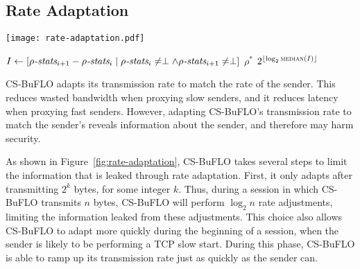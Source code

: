 \documentclass[10pt,journal]{IEEEtran}
\newcommand{\csb} {CS-BuFLO\xspace}
\begin{document}
\subsection{Rate Adaptation}
\label{ssec:rate-adaptation}



\begin{figure*}[t]
  \centering
  \texttt{[image: rate-adaptation.pdf]}
  \caption{Rate adaptation in \csb. $\rho^*$ is updated based on the packets
	  transmitted to the other end between $T_2$ and $T_{15}$. Time intervals
	  between two consecutive packets are stored in an array $Intervals[]$.
	  The two packets under consideration both contain some real payload
	  data and they belong to the same burst. i.e. $Intervals = [T_3-T_2,
	  T_5-T_3, T_9-T_8, T_{12}-T_{11}, T_{14}-T_{12}, T_{15}-T_{14}]$
	  and $\rho^*=2^{\lfloor\log_2 Median(Intervals[])\rfloor}$.}
  \label{fig:rate-adaptation}
\end{figure*}


\begin{algorithm}[t]
  \caption{Algorithm for estimating new value of $\rho^*$ based on past network performance.}
  \label{alg:rho-estimator}
  \begin{algorithmic}
    \State $I \gets \left[\rho\emph{-stats}_{i+1}-\rho\emph{-stats}_{i}\mid \rho\emph{-stats}_{i}\not=\perp\wedge \rho\emph{-stats}_{i+1}\not=\perp\right]$
      \State\Return $\rho^*$
    \Else
      \State\Return$2^{\lfloor\log_2\Call{median}{I}\rfloor}$
    \EndIf
    \EndFunction
  \end{algorithmic}
\end{algorithm}


\csb adapts its transmission rate to match the rate of the sender.
This reduces wasted bandwidth when proxying slow senders, and it
reduces latency when proxying fast senders.  However, adapting
\csb's transmission rate to match the sender's reveals information
about the sender, and therefore may harm security.

As shown in Figure~\ref{fig:rate-adaptation}, \csb takes several steps to limit
the information that is leaked through rate adaptation.  First, it only adapts
after transmitting $2^k$ bytes, for some integer $k$.  Thus, during a session
in which \csb transmits $n$ bytes, \csb will perform $\log_2 n$ rate
adjustments, limiting the information leaked from these adjustments.  This
choice also allows \csb to adapt more quickly during the beginning of a
session, when the sender is likely to be performing a TCP slow start.  During
this phase, \csb is able to ramp up its transmission rate just as quickly as
the sender can.
\end{document}
